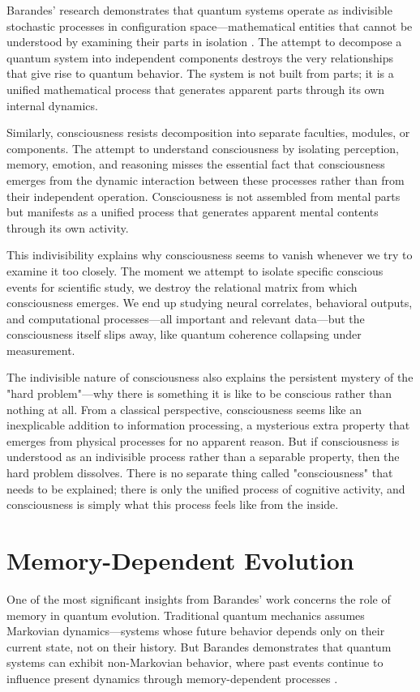 Barandes' research demonstrates that quantum systems operate as indivisible stochastic processes in configuration space—mathematical entities that cannot be understood by examining their parts in isolation \parencite{barandes2025quantum}. The attempt to decompose a quantum system into independent components destroys the very relationships that give rise to quantum behavior. The system is not built from parts; it is a unified mathematical process that generates apparent parts through its own internal dynamics.

Similarly, consciousness resists decomposition into separate faculties, modules, or components. The attempt to understand consciousness by isolating perception, memory, emotion, and reasoning misses the essential fact that consciousness emerges from the dynamic interaction between these processes rather than from their independent operation. Consciousness is not assembled from mental parts but manifests as a unified process that generates apparent mental contents through its own activity.

This indivisibility explains why consciousness seems to vanish whenever we try to examine it too closely. The moment we attempt to isolate specific conscious events for scientific study, we destroy the relational matrix from which consciousness emerges. We end up studying neural correlates, behavioral outputs, and computational processes—all important and relevant data—but the consciousness itself slips away, like quantum coherence collapsing under measurement.

The indivisible nature of consciousness also explains the persistent mystery of the "hard problem"—why there is something it is like to be conscious rather than nothing at all. From a classical perspective, consciousness seems like an inexplicable addition to information processing, a mysterious extra property that emerges from physical processes for no apparent reason. But if consciousness is understood as an indivisible process rather than a separable property, then the hard problem dissolves. There is no separate thing called "consciousness" that needs to be explained; there is only the unified process of cognitive activity, and consciousness is simply what this process feels like from the inside.

\section{Memory-Dependent Evolution}

One of the most significant insights from Barandes' work concerns the role of memory in quantum evolution. Traditional quantum mechanics assumes Markovian dynamics—systems whose future behavior depends only on their current state, not on their history. But Barandes demonstrates that quantum systems can exhibit non-Markovian behavior, where past events continue to influence present dynamics through memory-dependent processes \parencite{barandes2025quantum}.

